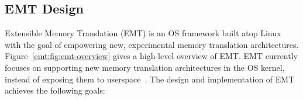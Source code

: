 \subsection{EMT Design}
\label{emt:sec:design}

\noindent
Extensible Memory Translation (EMT) is an OS framework
	built atop Linux
	with the goal of empowering new, experimental memory translation architectures.
Figure~\ref{emt:fig:emt-overview} gives a high-level overview of EMT.
EMT currently focuses on supporting new memory translation architectures in the OS kernel, instead of
	exposing them to userspace~\cite{engler1995avm}.
The design and implementation of EMT achieves the following goals:
